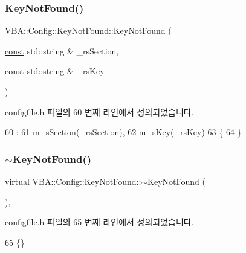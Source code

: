 \subsubsection{\texorpdfstring{Key\+Not\+Found()}{KeyNotFound()}}
{\footnotesize\ttfamily V\+B\+A\+::\+Config\+::\+Key\+Not\+Found\+::\+Key\+Not\+Found (\begin{DoxyParamCaption}\item[{\mbox{\hyperlink{getopt1_8c_a2c212835823e3c54a8ab6d95c652660e}{const}} std\+::string \&}]{\+\_\+rs\+Section,  }\item[{\mbox{\hyperlink{getopt1_8c_a2c212835823e3c54a8ab6d95c652660e}{const}} std\+::string \&}]{\+\_\+rs\+Key }\end{DoxyParamCaption})\hspace{0.3cm}{\ttfamily [inline]}}



configfile.\+h 파일의 60 번째 라인에서 정의되었습니다.


\begin{DoxyCode}
60                                                                       :
61     m\_sSection(\_rsSection),
62     m\_sKey(\_rsKey)
63     \{
64     \}
\end{DoxyCode}
\mbox{\label{class_v_b_a_1_1_config_1_1_key_not_found_a35313d3ebddcac7e640bf3b7e264b297}} 
\subsubsection{\texorpdfstring{$\sim$\+Key\+Not\+Found()}{~KeyNotFound()}}
{\footnotesize\ttfamily virtual V\+B\+A\+::\+Config\+::\+Key\+Not\+Found\+::$\sim$\+Key\+Not\+Found (\begin{DoxyParamCaption}{ }\end{DoxyParamCaption})\hspace{0.3cm}{\ttfamily [inline]}, {\ttfamily [virtual]}}



configfile.\+h 파일의 65 번째 라인에서 정의되었습니다.


\begin{DoxyCode}
65 \{\}
\end{DoxyCode}


